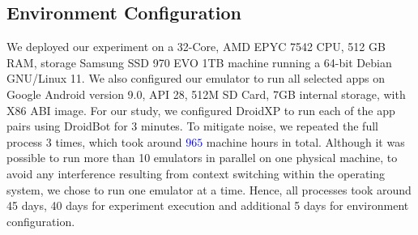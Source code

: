 
\subsection{Environment Configuration}\label{sec:hardware}


We deployed our experiment on a 32-Core, AMD EPYC 7542 CPU, 512 GB RAM, storage Samsung SSD 970 EVO 1TB machine running a 64-bit Debian GNU/Linux 11. We also configured our emulator to run all selected apps on Google Android version 9.0, API 28, 512M SD Card, 7GB internal storage, with X86 ABI image.
For our study, we configured DroidXP to run each of the \apps app pairs using DroidBot for 3 minutes. To mitigate noise, we repeated the full process 3 times,  which took around \textcolor{blue}{$965$} machine hours in total. Although it was possible to run more than 10 emulators in parallel on one physical machine, to avoid any interference resulting from context switching within the operating system, we chose to run one emulator at a time. Hence, all processes took around 45 days, 40 days for experiment execution and additional 5 days for environment configuration.%

